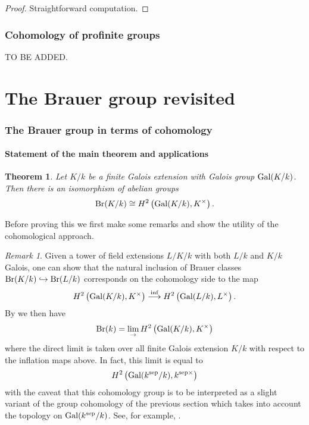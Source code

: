 \documentclass[11pt]{amsart}
\numberwithin{equation}{section}
\newtheorem{theorem}[equation]{Theorem}
\theoremstyle{remark}
\newtheorem{remark}[equation]{Remark}
\theoremstyle{remark}
\theoremstyle{remark}
\theoremstyle{definition}
\theoremstyle{definition}
\theoremstyle{definition}
\theoremstyle{definition}
\theoremstyle{definition}
\theoremstyle{definition}
\begin{document}
\begin{proof}
Straightforward computation.
\end{proof}

\section{Cohomology of profinite groups}

TO BE ADDED.

\part{The Brauer group revisited}

\section{The Brauer group in terms of cohomology}

\subsection{Statement of the main theorem and applications} 

\begin{theorem} \label{brauer as cohom main}
Let $K/k$ be a finite Galois extension with Galois group $\textup{Gal}(K/k)$. Then there is an isomorphism of abelian groups
\[\textup{Br}(K/k)\cong H^2\left(\textup{Gal}(K/k),K^\times\right).\]
\end{theorem}

Before proving this we first make some remarks and show the utility of the cohomological approach.

\begin{remark}
Given a tower of field extensions $L/K/k$ with both $L/k$ and $K/k$ Galois, one can show that the natural inclusion of Brauer classes $\textup{Br}(K/k)\hookrightarrow \textup{Br}(L/k)$ corresponds on the cohomology side to the map
\[H^2\left(\textup{Gal}(K/k),K^\times\right)\stackrel{\textup{inf}}{\longrightarrow}H^2\left(\textup{Gal}(L/k),L^\times\right).\]
By  we then have
\[\textup{Br}(k)=\lim_{\rightarrow}H^2\left(\textup{Gal}(K/k),K^\times\right)\]
where the direct limit is taken over all finite Galois extension $K/k$ with respect to the inflation maps above. In fact, this limit is equal to 
\[H^2\left(\textup{Gal}(k^\textup{sep}/k),k^{\textup{sep} \times}\right)\]
with the caveat that this cohomology group is to be interpreted as a slight variant of the group cohomology of the previous section which takes into account the topology on  $\textup{Gal}(k^\textup{sep}/k)$. See, for example, \cite{MR0225922}.
\end{remark}
\end{document}
